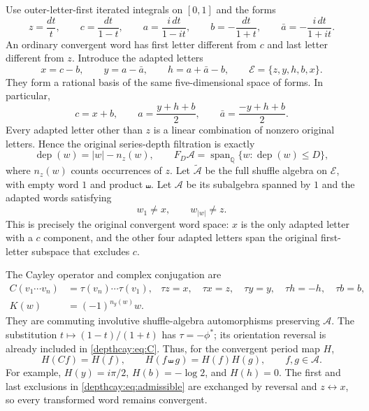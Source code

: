 Use outer-letter-first iterated integrals on $[0,1]$ and the forms
\[
 z=\frac{dt}{t},\qquad c=\frac{dt}{1-t},\qquad
 a=\frac{i\,dt}{1-it},\qquad b=-\frac{dt}{1+t},\qquad
 \bar a=-\frac{i\,dt}{1+it}.
\]
An ordinary convergent word has first letter different from $c$ and last
letter different from $z$. Introduce the adapted letters
\begin{equation}\label{depthcay:eq:alphabet}
 x=c-b,\qquad y=a-\bar a,\qquad h=a+\bar a-b,
 \qquad \mathcal E=\{z,y,h,b,x\}.
\end{equation}
They form a rational basis of the same five-dimensional space of forms.
In particular,
\[
 c=x+b,\qquad a=\frac{y+h+b}{2},\qquad
 \bar a=\frac{-y+h+b}{2}.
\]
Every adapted letter other than $z$ is a linear combination of nonzero
original letters. Hence the original series-depth filtration is exactly
\begin{equation}\label{depthcay:eq:depth}
 \operatorname{dep}(w)=|w|-n_z(w),\qquad
 F_D\mathcal A=\operatorname{span}_{\mathbb Q}
 \{w:\operatorname{dep}(w)\le D\},
\end{equation}
where $n_z(w)$ counts occurrences of $z$.
Let $\widetilde{\mathcal A}$ be the full shuffle algebra on $\mathcal E$,
with empty word $1$ and product $\shuffle$. Let $\mathcal A$ be its
subalgebra spanned by $1$ and the adapted words satisfying
\begin{equation}\label{depthcay:eq:admissible}
 w_1\ne x,\qquad w_{|w|}\ne z.
\end{equation}
This is precisely the original convergent word space: $x$ is the only
adapted letter with a $c$ component, and the other four adapted letters
span the original first-letter subspace that excludes $c$.

The Cayley operator and complex conjugation are
\begin{align}
 C(v_1\cdots v_n)&=\tau(v_n)\cdots\tau(v_1),&
 \tau z=x,\quad\tau x=z,\quad\tau y=y,\quad
 \tau h=-h,\quad\tau b=b,\label{depthcay:eq:C}\\
 K(w)&=(-1)^{n_y(w)}w.&&\label{depthcay:eq:K}
\end{align}
They are commuting involutive shuffle-algebra automorphisms preserving
$\mathcal A$. The substitution $t\mapsto(1-t)/(1+t)$ has
$\tau=-\phi^*$; its orientation reversal is already included in
\eqref{depthcay:eq:C}. Thus, for the convergent period map $H$,
\begin{equation}\label{depthcay:eq:period-C}
 H(Cf)=H(f),\qquad H(f\shuffle g)=H(f)H(g),\qquad f,g\in\mathcal A.
\end{equation}
For example, $H(y)=i\pi/2$, $H(b)=-\log2$, and $H(h)=0$.
The first and last exclusions in \eqref{depthcay:eq:admissible} are
exchanged by reversal and $z\leftrightarrow x$, so every transformed
word remains convergent.

